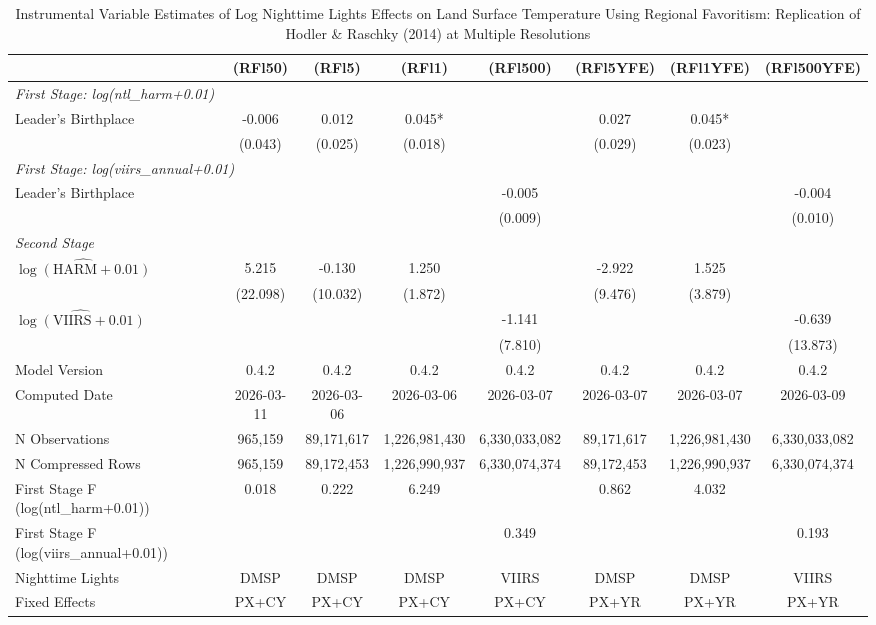 \begin{table}[htbp]
\centering
\footnotesize
\caption{Instrumental Variable Estimates of Log Nighttime Lights Effects on Land Surface Temperature Using Regional Favoritism: Replication of Hodler \& Raschky (2014) at Multiple Resolutions}
\begin{tabular}{lccccccc}
\toprule
 & (RFl50) & (RFl5) & (RFl1) & (RFl500) & (RFl5YFE) & (RFl1YFE) & (RFl500YFE) \\
\midrule
\midrule
\multicolumn{8}{l}{\textit{First Stage: log(ntl\_harm+0.01)}} \\
  Leader's Birthplace & -0.006 & 0.012 & 0.045* &  & 0.027 & 0.045* &  \\
 & (0.043) & (0.025) & (0.018) &  & (0.029) & (0.023) &  \\
\midrule
\multicolumn{8}{l}{\textit{First Stage: log(viirs\_annual+0.01)}} \\
  Leader's Birthplace &  &  &  & -0.005 &  &  & -0.004 \\
 &  &  &  & (0.009) &  &  & (0.010) \\
\midrule
\multicolumn{8}{l}{\textit{Second Stage}} \\
$\hat{\log(\text{HARM} + 0.01)}$ & 5.215 & -0.130 & 1.250 &  & -2.922 & 1.525 &  \\
 & (22.098) & (10.032) & (1.872) &  & (9.476) & (3.879) &  \\
$\hat{\log(\text{VIIRS} + 0.01)}$ &  &  &  & -1.141 &  &  & -0.639 \\
 &  &  &  & (7.810) &  &  & (13.873) \\
\midrule
Model Version & 0.4.2 & 0.4.2 & 0.4.2 & 0.4.2 & 0.4.2 & 0.4.2 & 0.4.2 \\
Computed Date & 2026-03-11 & 2026-03-06 & 2026-03-06 & 2026-03-07 & 2026-03-07 & 2026-03-07 & 2026-03-09 \\
N Observations & 965,159 & 89,171,617 & 1,226,981,430 & 6,330,033,082 & 89,171,617 & 1,226,981,430 & 6,330,033,082 \\
N Compressed Rows & 965,159 & 89,172,453 & 1,226,990,937 & 6,330,074,374 & 89,172,453 & 1,226,990,937 & 6,330,074,374 \\
First Stage F (log(ntl\_harm+0.01)) & 0.018 & 0.222 & 6.249 &  & 0.862 & 4.032 &  \\
First Stage F (log(viirs\_annual+0.01)) &  &  &  & 0.349 &  &  & 0.193 \\
\midrule
Nighttime Lights & DMSP & DMSP & DMSP & VIIRS & DMSP & DMSP & VIIRS \\
Fixed Effects & PX+CY & PX+CY & PX+CY & PX+CY & PX+YR & PX+YR & PX+YR \\

\end{tabular}
\end{table}

